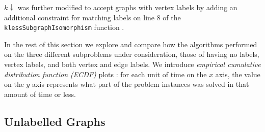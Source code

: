\documentclass{l4proj}
\theoremstyle{definition}
\theoremstyle{remark}
\begin{document}
$k\downarrow$ was further modified to accept graphs with vertex labels by adding
an additional constraint for matching labels on line 8 of the
\texttt{klessSubgraphIsomorphism} function \cite{DBLP:conf/aaai/HoffmannMR17}.

In the rest of this section we explore and compare how the algorithms performed
on the three different subproblems under consideration, those of having no
labels, vertex labels, and both vertex and edge labels. We introduce
\emph{empirical cumulative distribution function (ECDF)}
plots \cite{10.2307/2334448}: for each unit of time on the $x$ axis, the value on
the $y$ axis represents what part of the problem instances was solved in that
amount of time or less.

\subsection{Unlabelled Graphs}
\end{document}
